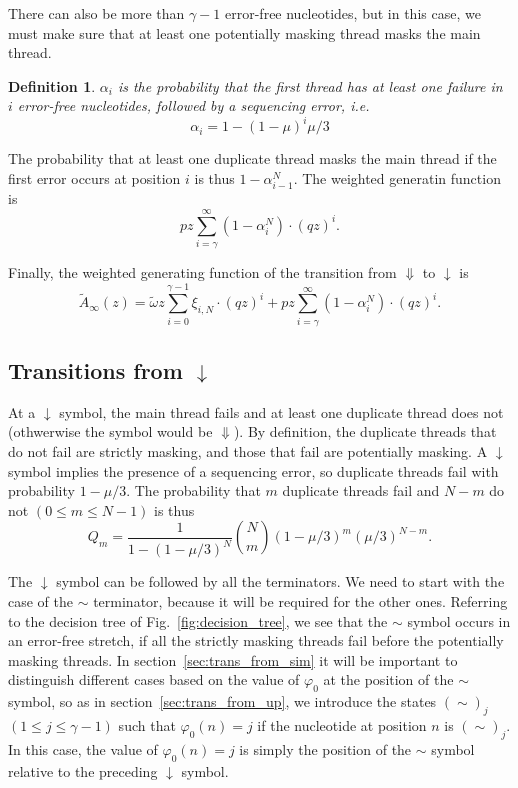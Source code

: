 \documentclass{article}
\newtheorem{definition}{Definition}
\begin{document}
There can also be more than $\gamma-1$ error-free nucleotides, but in this
case, we must make sure that at least one potentially masking thread masks
the main thread.

\begin{definition}
$\alpha_i$ is the probability that the first thread has at least one
failure in $i$ error-free nucleotides, followed by a sequencing error,
\textit{i.e.}
\begin{equation}
\alpha_i = 1 - (1-\mu)^i\mu/3
\end{equation}
\end{definition}

The probability that at least one duplicate thread masks the main thread
if the first error occurs at position $i$ is thus $1 - \alpha_{i-1}^N$.
The weighted generatin function is
\begin{equation}
pz\sum_{i=\gamma}^\infty (1 - \alpha_i^N) \cdot (qz)^i.
\end{equation}

Finally, the weighted generating function of the transition from
$\Downarrow$ to $\downarrow$ is
\begin{equation}
\tilde{A}_\infty(z) =
\tilde{\omega} z \sum_{i=0}^{\gamma-1} \xi_{i,N} \cdot (qz)^i +
pz\sum_{i=\gamma}^\infty (1 - \alpha_i^N) \cdot (qz)^i.
\end{equation}

\subsection{Transitions from $\downarrow$}
\label{sec:trans_from_down}

At a $\downarrow$ symbol, the main thread fails and at least one duplicate
thread does not (othwerwise the symbol would be $\Downarrow$). By
definition, the duplicate threads that do not fail are strictly masking,
and those that fail are potentially masking. A $\downarrow$ symbol implies
the presence of a sequencing error, so duplicate threads fail with
probability $1-\mu/3$. The probability that $m$ duplicate threads fail and
$N-m$ do not $(0 \leq m \leq N-1)$ is thus
\begin{equation}
  Q_m = \frac{1}{1-(1-\mu/3)^N}{N \choose m} (1-\mu/3)^m(\mu/3)^{N-m}.
\end{equation}

The $\downarrow$ symbol can be followed by all the terminators. We need to
start with the case of the $\sim$ terminator, because it will be required
for the other ones. Referring to the decision tree of
Fig.~\ref{fig:decision_tree}, we see that the $\sim$ symbol occurs in an
error-free stretch, if all the strictly masking threads fail before the
potentially masking threads. In section~\ref{sec:trans_from_sim} it will
be important to distinguish different cases based on the value of
$\varphi_0$ at the position of the $\sim$ symbol, so as in
section~\ref{sec:trans_from_up}, we introduce the states $(\sim)_j$ $(1
\leq j \leq \gamma-1)$ such that $\varphi_0(n) = j$ if the nucleotide at
position $n$ is $(\sim)_j$. In this case, the value of $\varphi_0(n) = j$
is simply the position of the $\sim$ symbol relative to the preceding
$\downarrow$ symbol.
\end{document}
